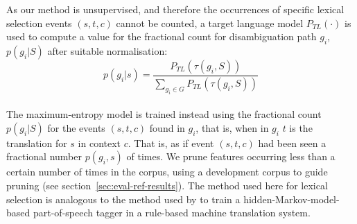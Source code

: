 \documentclass[11pt]{article}
\newcommand{\comment}[1]{\todo{#1}}
\begin{document}

As our method is unsupervised, and therefore the occurrences of
specific lexical selection events \((s,t,c)\) cannot be counted, a
target language model \(P_{TL}(\cdot)\) is used to compute a value for
the fractional count for disambiguation path \(g_i\), $p(g_i|S)$ after
suitable normalisation:
\begin{equation}
 \label{eq:normalising}
   p(g_i|s) = \frac{P_{TL}(\tau(g_i,S))}{\sum_{g_i \in G} P_{TL}(\tau(g_i,S))}
\end{equation}
~\\
The maximum-entropy model is trained instead using the fractional count
$p(g_i|S)$ for the events $(s,t,c)$ found in \(g_i\), that is, when in
\(g_i\) $t$ is the translation for \(s\) in context \(c\). That is, as
if event $(s,t,c)$ had been seen a fractional number $p(g_i,s)$ of
times. We prune features occurring less than a certain number of times 
in the corpus, using a development corpus to guide pruning (see section~\ref{sec:eval-ref-results}).
The method used here
for lexical selection is analogous to the method used by
\cite{sanchez08b} to train a hidden-Markov-model-based part-of-speech
tagger in a rule-based machine translation system. 
% 
\end{document}
